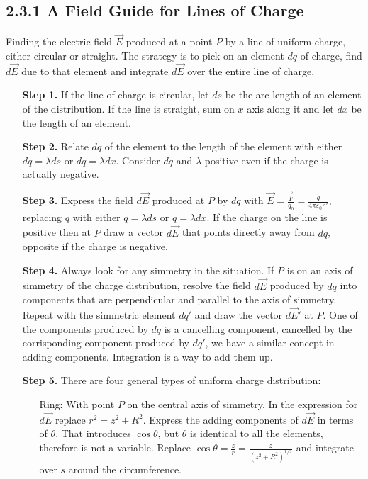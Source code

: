 \documentclass[12pt, a4paper]{article}
\begin{document}
		\subsection*{2.3.1 A Field Guide for Lines of Charge}
		Finding the electric field $\vec{E}$ produced at a point $P$ by a line of uniform charge, either circular or straight. The strategy is to pick on an element $dq$ of charge, find $d\vec{E}$ due to that element and integrate $d\vec{E}$ over the entire line of charge.
		\begin{itemize}
			\item[\textbf{Step 1.}] If the line of charge is circular, let $ds$ be the arc length of an element of the distribution. If the line is straight, sum on $x$ axis along it and let $dx$ be the length of an element.
			
			\item[\textbf{Step 2.}] Relate $dq$ of the element to the length of the element with either $dq = \lambda ds$ or $dq = \lambda dx$. Consider $dq$ and $\lambda$ positive even if the charge is actually negative.
			
			\item[\textbf{Step 3.}] Express the field $d\vec{E}$ produced at $P$ by $dq$ with
			$\vec{E} = \frac{\vec{F}}{q_0} = \frac{q}{4\pi\varepsilon_0r^2}$, replacing $q$ with either $q = \lambda ds$ or $q = \lambda dx$. If the charge on the line is positive then at $P$ draw a vector $d\vec{E}$ that points directly away from $dq$, opposite if the charge is negative.
			
			\item[\textbf{Step 4.}] Always look for any simmetry in the situation. If $P$ is on an axis of simmetry of the charge distribution, resolve the field $d\vec{E}$ produced by $dq$ into components that are perpendicular and parallel to the axis of simmetry. Repeat with the simmetric element $dq'$ and draw the vector $d\vec{E}'$ at $P$. One of the components produced by $dq$ is a cancelling component, cancelled by the corrisponding component produced by $dq'$, we have a similar concept in adding components. Integration is a way to add them up.
			
			\item[\textbf{Step 5.}] There are four general types of uniform charge distribution:
				\begin{itemize} 
					\item[Ring:] With point $P$ on the central axis of simmetry. In the expression for $d\vec{E}$ replace $r^2 = \textit{z}^2 + R^2$. Express the adding components of $d\vec{E}$ in terms of $\theta$. That introduces $\cos\theta$, but $\theta$ is identical to all the elements, therefore is not a variable. Replace $\cos\theta = \frac{\textit{z}}{r} = \frac{\textit{z}}{(\textit{z}^2 + R^2)^{1/2}}$ and integrate over $s$ around the circumference.
					

\end{itemize}
\end{itemize}
\end{document}
